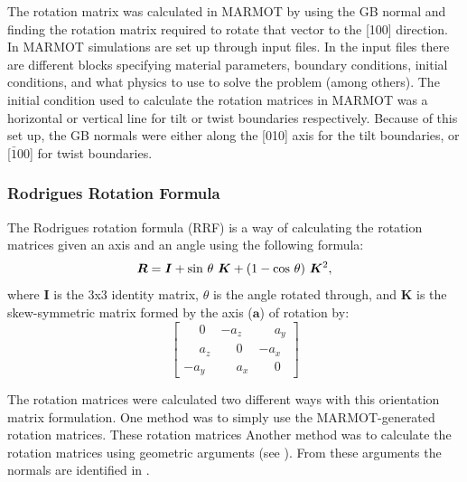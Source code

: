 \documentclass[12pt]{report}
\begin{document}
The rotation matrix was calculated in MARMOT by using the GB normal and finding the rotation matrix required to rotate that vector to the [100] direction.  In MARMOT simulations are set up through input files.  In the input files there are different blocks specifying material parameters, boundary conditions, initial conditions, and what physics to use to solve the problem (among others).  The initial condition used to calculate the rotation matrices in MARMOT was a horizontal or vertical line for tilt or twist boundaries respectively.  Because of this set up, the GB normals were either along the [010] axis for the tilt boundaries, or [$\bar{1}$00] for twist boundaries.

\subsubsection{Rodrigues Rotation Formula}
The Rodrigues rotation formula\cite{belongie2006} (RRF) is a way of calculating the rotation matrices given an axis and an angle using the following formula:
\begin{equation}
\label{eq:rrf}
\bm{R} = \bm{I} + \textnormal{sin}\ \theta\ \bm{K} + (1 - \textnormal{cos}\ \theta)\ \bm{K}^2,
\end{equation}
where $\bm{I}$ is the 3x3 identity matrix, $\theta$ is the angle rotated through, and $\bm{K}$ is the skew-symmetric matrix formed by the axis ($\bm{a}$) of rotation by:
\begin{equation}
\label{eq:skewSymMat}
\left[
\begin{array}{ccc}
\phantom{-}0 & -a_z & \phantom{-}a_y \\
\phantom{-}a_z & \phantom{-}0 & -a_x \\
-a_y & \phantom{-}a_x & \phantom{-}0
\end{array}
\right]
\end{equation}

The rotation matrices were calculated two different ways with this orientation matrix formulation.  One method was to simply use the MARMOT-generated rotation matrices.  These rotation matrices Another method was to calculate the rotation matrices using geometric arguments (see ).  From these arguments the normals are identified in .
\end{document}

